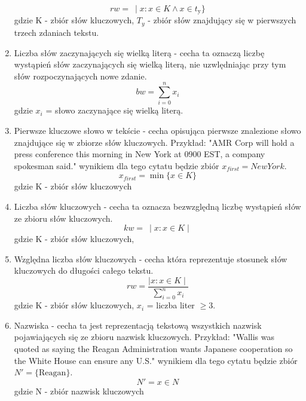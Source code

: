 \documentclass{article}
\begin{document}
\begin{enumerate}
        \begin{equation}
            rw = \ \mid x : x \in K \wedge x \in t_{\text{y}} \}
        \end{equation}
        gdzie K - zbiór słów kluczowych, \( T_y \) - zbiór słów znajdujący się w pierwszych trzech zdaniach tekstu.
    \item Liczba słów zaczynających się wielką literą - cecha ta oznaczą liczbę wystąpień słów zaczynających się wielką literą, nie uzwlędniając przy tym słów rozpoczynających nowe zdanie.
        \begin{equation}
            bw = \sum_{i=0}^{n} x_i
        \end{equation}
        gdzie \( x_i \) = słowo zaczynające się wielką literą.
    \item Pierwsze kluczowe słowo w tekście - cecha opisująca pierwsze znalezione słowo znajdujące się w zbiorze słów kluczowych. Przykład: "AMR Corp will hold a press conference this morning in New York at 0900 EST, a company spokesman said." wynikiem dla tego cytatu będzie zbiór \(x_{first} = New York \).
       \begin{equation}
            x_{first} = \min \{ x \in K \}
        \end{equation}
        gdzie K - zbiór słów kluczowych
    \item Liczba słów kluczowych - cecha ta oznacza bezwzględną liczbę wystąpień słów ze zbioru słów kluczowych. 
        \begin{equation}
            kw = \ \mid x : x \in K \mid
        \end{equation}
        gdzie K - zbiór słów kluczowych,
    \item Względna liczba słów kluczowych - cecha która reprezentuje stosunek słów kluczowych do długości całego tekstu. 
        \begin{equation}
            rw = \frac{ \mid x : x \in K \mid}{ \sum_{i=0}^{n} x_i}
        \end{equation}
       gdzie K - zbiór słów kluczowych, \( x_i \) = liczba liter \( \geq 3 \).
    \item Nazwiska - cecha ta jest reprezentacją tekstową wszystkich nazwisk pojawiających się ze zbioru nazwisk kluczowych. Przykład: "Wallis was quoted as saying the Reagan Administration wants Japanese cooperation so the White House can ensure any U.S." wynikiem dla tego cytatu będzie zbiór \( N' = \{ \text{Reagan} \} \).
    \begin{equation}
            N' =  x \in N 
        \end{equation}
        gdzie N - zbiór nazwisk kluczowych
\end{enumerate}
\end{document}
